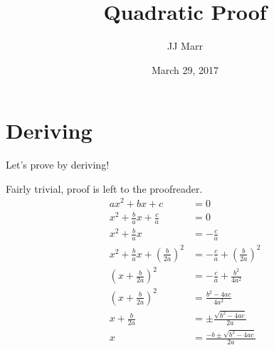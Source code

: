\documentclass[letterpaper, 12pt]{article} %
\title{Quadratic Proof} %
\author{JJ Marr} %
\date{March 29, 2017} %
\begin{document}
	\maketitle %
	\tableofcontents %
	\newpage %
	\section{Deriving} %
	Let's prove by deriving!
	
	Fairly trivial, proof is left to the proofreader.
	\begin{align*}
		ax^2 + bx + c &= 0\\ %
		x^2 + \frac{b}{a}x + \frac{c}{a} &= 0\\ %
		x^2 + \frac{b}{a}x &= - \frac{c}{a}\\ %
		x^2 + \frac{b}{a}x + (\frac{b}{2a})^2&= - \frac{c}{a} + (\frac{b}{2a})^2\\ %
		(x + \frac{b}{2a})^2 &= - \frac{c}{a} + \frac{b^2}{4a^2}\\ %
		(x + \frac{b}{2a})^2 &= \frac{b^2 - 4ac}{4a^2}\\ %
		x + \frac{b}{2a}&= \pm\frac{\sqrt{b^2 - 4ac}}{2a}\\ %
		x&= \frac{- b \pm \sqrt{b^2 - 4ac}}{2a} %
	\end{align*}
\end{document}
